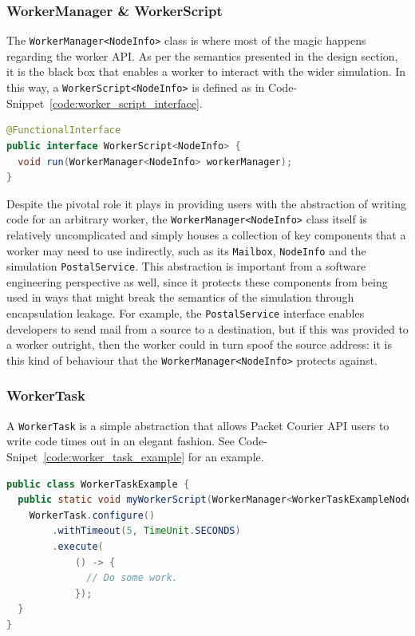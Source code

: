 \subsubsection{WorkerManager \& WorkerScript}

The \texttt{WorkerManager<NodeInfo>} class is where most of the magic happens regarding the worker API. As per the
semantics presented in the design section, it is the black box that enables a worker to interact with the wider
simulation. In this way, a \texttt{WorkerScript<NodeInfo>} is defined as in
Code-Snippet~\ref{code:worker_script_interface}.
\begin{lstlisting}[language=Java,caption={The \texttt{WorkerScript<NodeInfo>} interface exactly as it appears in the
codebase.},label={code:worker_script_interface},captionpos=b]
@FunctionalInterface
public interface WorkerScript<NodeInfo> {
  void run(WorkerManager<NodeInfo> workerManager);
}
\end{lstlisting}

Despite the pivotal role it plays in providing users with the abstraction of writing code for an arbitrary worker,
the \texttt{WorkerManager<NodeInfo>} class itself is relatively uncomplicated and simply houses a collection of key
components that a worker may need to use indirectly, such as its \texttt{Mailbox}, \texttt{NodeInfo} and the
simulation \texttt{PostalService}. This abstraction is important from a software engineering perspective as well,
since it protects these components from being used in ways that might break the semantics of the simulation through
encapsulation leakage. For example, the \texttt{PostalService} interface enables developers to send mail from a
source to a destination, but if this was provided to a worker outright, then the worker could in turn spoof the
source address: it is this kind of behaviour that the \texttt{WorkerManager<NodeInfo>} protects against.

\subsubsection{WorkerTask}

A \texttt{WorkerTask} is a simple abstraction that allows Packet Courier API users to write code times out in an
elegant fashion. See Code-Snipet~\ref{code:worker_task_example} for an example.
\begin{lstlisting}[language=Java,caption={An example of how \texttt{WorkerTask} might be used.},
    label={code:worker_task_example},captionpos=b]
public class WorkerTaskExample {
  public static void myWorkerScript(WorkerManager<WorkerTaskExampleNodeInfo> workerManager) {
    WorkerTask.configure()
        .withTimeout(5, TimeUnit.SECONDS)
        .execute(
            () -> {
              // Do some work.
            });
  }
}
\end{lstlisting}

